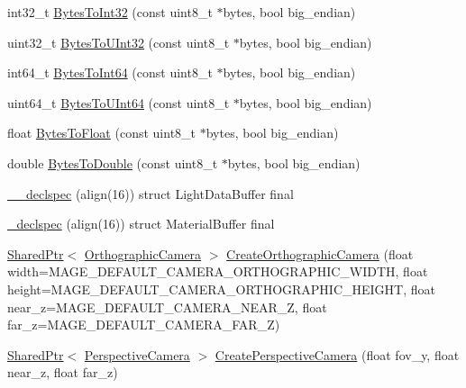 \begin{DoxyCompactItemize}
\item 
int32\+\_\+t \hyperlink{namespacemage_a274862b36cabc10b90dd7148d42a29a6}{Bytes\+To\+Int32} (const uint8\+\_\+t $\ast$bytes, bool big\+\_\+endian)
\item 
uint32\+\_\+t \hyperlink{namespacemage_a46a019c7f927a6f559b36a8b5c01ab9c}{Bytes\+To\+U\+Int32} (const uint8\+\_\+t $\ast$bytes, bool big\+\_\+endian)
\item 
int64\+\_\+t \hyperlink{namespacemage_a09884643d0e3afe8591f9104785ce480}{Bytes\+To\+Int64} (const uint8\+\_\+t $\ast$bytes, bool big\+\_\+endian)
\item 
uint64\+\_\+t \hyperlink{namespacemage_a93f1f8baabf199005ea96e0a2b6941e3}{Bytes\+To\+U\+Int64} (const uint8\+\_\+t $\ast$bytes, bool big\+\_\+endian)
\item 
float \hyperlink{namespacemage_a5e41913a3a1613add8511e5834e09277}{Bytes\+To\+Float} (const uint8\+\_\+t $\ast$bytes, bool big\+\_\+endian)
\item 
double \hyperlink{namespacemage_af85b8ba1e336f37fc8fe34a53e981a6c}{Bytes\+To\+Double} (const uint8\+\_\+t $\ast$bytes, bool big\+\_\+endian)
\item 
\hyperlink{namespacemage_acb52a2b7136d871548446f56ecb1b36c}{\+\_\+\+\_\+declspec} (align(16)) struct Light\+Data\+Buffer final
\item 
\hyperlink{namespacemage_a76dac28d69746bdef408a08c36a7c862}{\+\_\+declspec} (align(16)) struct Material\+Buffer final
\item 
\hyperlink{namespacemage_a1e01ae66713838a7a67d30e44c67703e}{Shared\+Ptr}$<$ \hyperlink{classmage_1_1_orthographic_camera}{Orthographic\+Camera} $>$ \hyperlink{namespacemage_abceafa3c16065a9d0e9a6b2482316f45}{Create\+Orthographic\+Camera} (float width=M\+A\+G\+E\+\_\+\+D\+E\+F\+A\+U\+L\+T\+\_\+\+C\+A\+M\+E\+R\+A\+\_\+\+O\+R\+T\+H\+O\+G\+R\+A\+P\+H\+I\+C\+\_\+\+W\+I\+D\+TH, float height=M\+A\+G\+E\+\_\+\+D\+E\+F\+A\+U\+L\+T\+\_\+\+C\+A\+M\+E\+R\+A\+\_\+\+O\+R\+T\+H\+O\+G\+R\+A\+P\+H\+I\+C\+\_\+\+H\+E\+I\+G\+HT, float near\+\_\+z=M\+A\+G\+E\+\_\+\+D\+E\+F\+A\+U\+L\+T\+\_\+\+C\+A\+M\+E\+R\+A\+\_\+\+N\+E\+A\+R\+\_\+Z, float far\+\_\+z=M\+A\+G\+E\+\_\+\+D\+E\+F\+A\+U\+L\+T\+\_\+\+C\+A\+M\+E\+R\+A\+\_\+\+F\+A\+R\+\_\+Z)
\item 
\hyperlink{namespacemage_a1e01ae66713838a7a67d30e44c67703e}{Shared\+Ptr}$<$ \hyperlink{classmage_1_1_perspective_camera}{Perspective\+Camera} $>$ \hyperlink{namespacemage_a4431fdebdb526878bacc4028cb94a63b}{Create\+Perspective\+Camera} (float fov\+\_\+y, float near\+\_\+z, float far\+\_\+z)

\end{DoxyCompactItemize}

